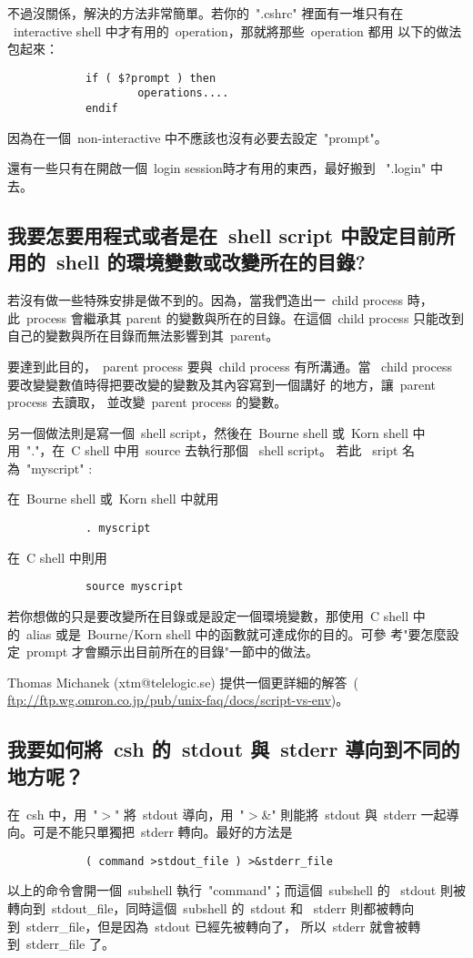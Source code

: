 \documentclass{article}
\begin{document}
\begin{CJK*}{Bg5}{ming}
	不過沒關係，解決的方法非常簡單。若你的~".cshrc" 裡面有一堆只有在 
	~interactive shell 中才有用的~operation，那就將那些~operation 都用
	以下的做法包起來：
\begin{verbatim}
            if ( $?prompt ) then
                    operations....
            endif
\end{verbatim}
	因為在一個~non-interactive 中不應該也沒有必要去設定~"prompt"。

	還有一些只有在開啟一個~login session時才有用的東西，最好搬到 
	~".login" 中去。

\subsection{我要怎要用程式或者是在~shell script 中設定目前所用的~shell 
	的環境變數或改變所在的目錄?}

	若沒有做一些特殊安排是做不到的。因為，當我們造出一~child process 
	時，此~process 會繼承其 parent 的變數與所在的目錄。在這個~child 
	process 只能改到自己的變數與所在目錄而無法影響到其~parent。

	要達到此目的，~parent process 要與~child process 有所溝通。當 
	~child process 要改變變數值時得把要改變的變數及其內容寫到一個講好
	的地方，讓~parent process 去讀取， 並改變~parent process 的變數。


	另一個做法則是寫一個~shell script，然後在~Bourne shell 或~Korn 
	shell 中用~"."，在~C shell 中用~source 去執行那個 ~shell script。
	若此 ~sript 名為~"myscript" :

	在~Bourne shell 或~Korn shell 中就用
\begin{verbatim}
        	. myscript
\end{verbatim}
	在~C shell 中則用
\begin{verbatim}
	        source myscript
\end{verbatim}
	若你想做的只是要改變所在目錄或是設定一個環境變數，那使用~C shell 
	中的~alias 或是~Bourne/Korn shell 中的函數就可達成你的目的。可參
	考"要怎麼設定~prompt 才會顯示出目前所在的目錄"一節中的做法。

	Thomas Michanek (xtm@telelogic.se) 提供一個更詳細的解答~( 
	\url{ftp://ftp.wg.omron.co.jp/pub/unix-faq/docs/script-vs-env})。

\subsection{我要如何將~csh 的~stdout 與~stderr 導向到不同的地方呢？}

	在~csh 中，用~"$>$" 將~stdout 導向，用~"$>$\&" 則能將~stdout 與~stderr 
	一起導向。可是不能只單獨把~stderr 轉向。最好的方法是
\begin{verbatim}
	        ( command >stdout_file ) >&stderr_file
\end{verbatim}
	以上的命令會開一個~subshell 執行~"command"；而這個~subshell 的 
	~stdout 則被轉向到~stdout\_file，同時這個~subshell 的~stdout 和 
	~stderr 則都被轉向到~stderr\_file，但是因為~stdout 已經先被轉向了，
	所以~stderr 就會被轉到~stderr\_file 了。


\end{CJK*}
\end{document}
